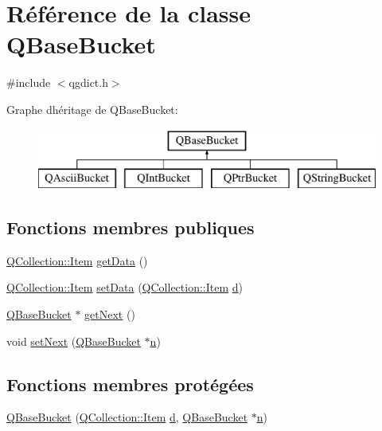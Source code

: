 \hypertarget{class_q_base_bucket}{}\section{Référence de la classe Q\+Base\+Bucket}
\label{class_q_base_bucket}


{\ttfamily \#include $<$qgdict.\+h$>$}

Graphe d\textquotesingle{}héritage de Q\+Base\+Bucket\+:\begin{figure}[H]
\begin{center}
\leavevmode
\includegraphics[height=2.000000cm]{class_q_base_bucket}
\end{center}
\end{figure}
\subsection*{Fonctions membres publiques}
\begin{DoxyCompactItemize}
\item 
\hyperlink{class_q_collection_ac6f3ddbf999e31fb797927f71ae6b5d7}{Q\+Collection\+::\+Item} \hyperlink{class_q_base_bucket_a4a1bd6dbabde86a139c0c3762d460903}{get\+Data} ()
\item 
\hyperlink{class_q_collection_ac6f3ddbf999e31fb797927f71ae6b5d7}{Q\+Collection\+::\+Item} \hyperlink{class_q_base_bucket_ae8fbd57c08046446acef5b7cc545637c}{set\+Data} (\hyperlink{class_q_collection_ac6f3ddbf999e31fb797927f71ae6b5d7}{Q\+Collection\+::\+Item} \hyperlink{060__command__switch_8tcl_af43f4b1f0064a33b2d662af9f06d3a00}{d})
\item 
\hyperlink{class_q_base_bucket}{Q\+Base\+Bucket} $\ast$ \hyperlink{class_q_base_bucket_abb5cadafab13c807edebf2c856883a22}{get\+Next} ()
\item 
void \hyperlink{class_q_base_bucket_a08ad877af89ea4f2ecfaf116d18e713f}{set\+Next} (\hyperlink{class_q_base_bucket}{Q\+Base\+Bucket} $\ast$\hyperlink{060__command__switch_8tcl_acdde3cd86eb2421ce8dbb2e85227d368}{n})
\end{DoxyCompactItemize}
\subsection*{Fonctions membres protégées}
\begin{DoxyCompactItemize}
\item 
\hyperlink{class_q_base_bucket_a06197e38e74637c4baf78a31cd778ca9}{Q\+Base\+Bucket} (\hyperlink{class_q_collection_ac6f3ddbf999e31fb797927f71ae6b5d7}{Q\+Collection\+::\+Item} \hyperlink{060__command__switch_8tcl_af43f4b1f0064a33b2d662af9f06d3a00}{d}, \hyperlink{class_q_base_bucket}{Q\+Base\+Bucket} $\ast$\hyperlink{060__command__switch_8tcl_acdde3cd86eb2421ce8dbb2e85227d368}{n})
\end{DoxyCompactItemize}
